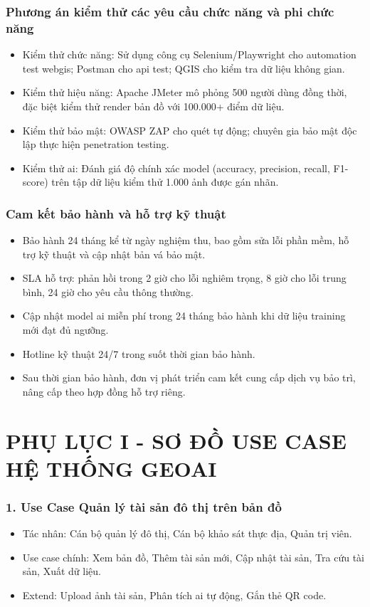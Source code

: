 \subsubsection{Phương án kiểm thử các yêu cầu chức năng và phi chức năng}
\begin{itemize}
    \item Kiểm thử chức năng: Sử dụng công cụ Selenium/Playwright cho automation test \gls{webgis}; Postman cho \gls{api} test; QGIS cho kiểm tra dữ liệu không gian.
    \item Kiểm thử hiệu năng: Apache JMeter mô phỏng 500 người dùng đồng thời, đặc biệt kiểm thử render bản đồ với 100.000+ điểm dữ liệu.
    \item Kiểm thử bảo mật: OWASP ZAP cho quét tự động; chuyên gia bảo mật độc lập thực hiện penetration testing.
    \item Kiểm thử \gls{ai}: Đánh giá độ chính xác model (accuracy, precision, recall, F1-score) trên tập dữ liệu kiểm thử 1.000 ảnh được gán nhãn.
\end{itemize}

\subsubsection{Cam kết bảo hành và hỗ trợ kỹ thuật}
\begin{itemize}
    \item Bảo hành 24 tháng kể từ ngày nghiệm thu, bao gồm sửa lỗi phần mềm, hỗ trợ kỹ thuật và cập nhật bản vá bảo mật.
    \item SLA hỗ trợ: phản hồi trong 2 giờ cho lỗi nghiêm trọng, 8 giờ cho lỗi trung bình, 24 giờ cho yêu cầu thông thường.
    \item Cập nhật model \gls{ai} miễn phí trong 24 tháng bảo hành khi dữ liệu training mới đạt đủ ngưỡng.
    \item Hotline kỹ thuật 24/7 trong suốt thời gian bảo hành.
    \item Sau thời gian bảo hành, đơn vị phát triển cam kết cung cấp dịch vụ bảo trì, nâng cấp theo hợp đồng hỗ trợ riêng.
\end{itemize}
\cleardoublepage
\section*{PHỤ LỤC I - SƠ ĐỒ USE CASE HỆ THỐNG GEOAI}

\subsubsection*{1. Use Case Quản lý tài sản đô thị trên bản đồ}
\begin{itemize}
    \item Tác nhân: Cán bộ quản lý đô thị, Cán bộ khảo sát thực địa, Quản trị viên.
    \item Use case chính: Xem bản đồ, Thêm tài sản mới, Cập nhật tài sản, Tra cứu tài sản, Xuất dữ liệu.
    \item Extend: Upload ảnh tài sản, Phân tích \gls{ai} tự động, Gắn thẻ QR code.
\end{itemize}

